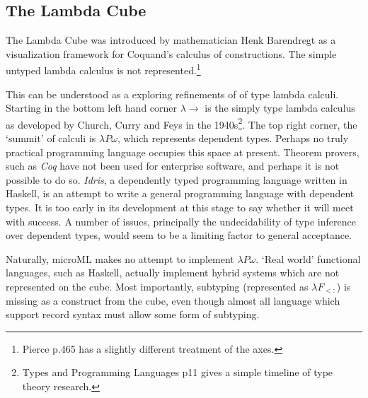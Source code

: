\documentclass[12pt, a4paper]{report}
\begin{document}
\subsection{The Lambda Cube}
The Lambda Cube was introduced by mathematician Henk Barendregt as a visualization framework for
Coquand's calculus of constructions. The simple untyped lambda calculus is not
represented.\footnote{Pierce p.465 has a slightly different treatment of the axes.}



This can be understood as a exploring refinements of of type lambda calculi. Starting in the bottom
left hand corner $\lambda \rightarrow$ is the simply type lambda calculus as developed by Church,
Curry and Feys in the 1940s\footnote{Types and Programming Languages p11 gives a simple timeline of
    type theory research.}. The top right corner, the `summit' of calculi is $\lambda P \omega$, which
represents dependent types. Perhaps no truly practical programming language occupies this space at
present. Theorem provers, such as \textit{Coq} have not been used for enterprise software, and
perhaps it is not possible to do so. \textit{Idris}, a dependently typed programming language
written in Haskell, is an attempt to write a general programming language with dependent types. It is
too early in its development at this stage to say whether it will meet with success. A number of
issues, principally the undecidability of type inference over dependent types, would seem to be a
limiting factor to general acceptance. 

Naturally, microML makes no attempt to implement $\lambda P\omega$. `Real world' functional
languages, such as Haskell, actually implement hybrid systems which are not represented on the cube.
Most importantly, subtyping (represented as $\lambda F_{<:}$) is missing as a construct from the cube, 
even though almost all language which support record syntax must allow some form of subtyping.
\end{document}
